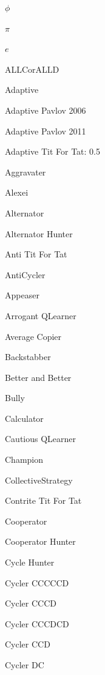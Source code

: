 \item $\phi$~\cite{axelrodproject}
\item $\pi$~\cite{axelrodproject}
\item $e$~\cite{axelrodproject}
\item ALLCorALLD \cite{axelrodproject}
\item Adaptive~\cite{Li2011}
\item Adaptive Pavlov 2006~\cite{kendall2007iterated}
\item Adaptive Pavlov 2011~\cite{Li2011}
\item Adaptive Tit For Tat: 0.5~\cite{Tzafestas2000}
\item Aggravater~\cite{axelrodproject}
\item Alexei~\cite{lesswrong}
\item Alternator~\cite{Axelrod1981, Mittal2009}
\item Alternator Hunter~\cite{axelrodproject}
\item Anti Tit For Tat~\cite{Hilbe2013}
\item AntiCycler~\cite{axelrodproject}
\item Appeaser~\cite{axelrodproject}
\item Arrogant QLearner~\cite{axelrodproject}
\item Average Copier~\cite{axelrodproject}
\item Backstabber~\cite{axelrodproject}
\item Better and Better~\cite{prison}
\item Bully~\cite{Nachbar1992}
\item Calculator~\cite{prison}
\item Cautious QLearner~\cite{axelrodproject}
\item Champion~\cite{Axelrod1980b}
\item CollectiveStrategy~\cite{Li2009}
\item Contrite Tit For Tat~\cite{Axelrod1995}
\item Cooperator~\cite{Axelrod1981, Mittal2009, Press2012}
\item Cooperator Hunter~\cite{axelrodproject}
\item Cycle Hunter~\cite{axelrodproject}
\item Cycler CCCCCD~\cite{axelrodproject}
\item Cycler CCCD~\cite{axelrodproject}
\item Cycler CCCDCD~\cite{axelrodproject}
\item Cycler CCD~\cite{Mittal2009}
\item Cycler DC~\cite{axelrodproject}
